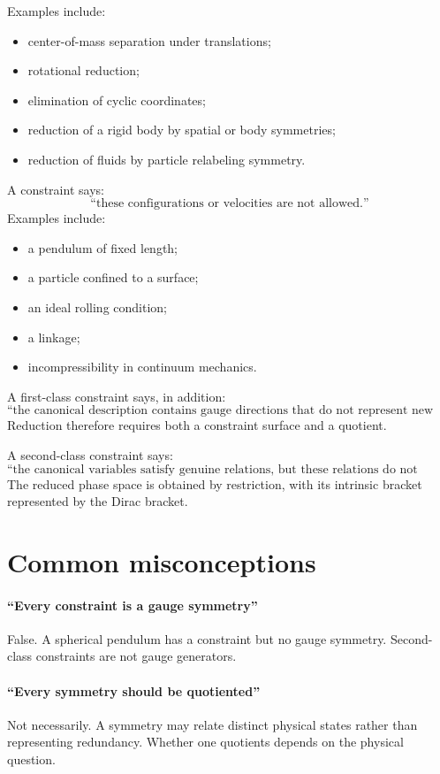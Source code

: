 Examples include:
\begin{itemize}
\item center-of-mass separation under translations;
\item rotational reduction;
\item elimination of cyclic coordinates;
\item reduction of a rigid body by spatial or body symmetries;
\item reduction of fluids by particle relabeling symmetry.
\end{itemize}

A constraint says:
\[
        \text{``these configurations or velocities are not allowed.''}
\]
Examples include:
\begin{itemize}
\item a pendulum of fixed length;
\item a particle confined to a surface;
\item an ideal rolling condition;
\item a linkage;
\item incompressibility in continuum mechanics.
\end{itemize}

A first-class constraint says, in addition:
\[
        \text{``the canonical description contains gauge directions
        that do not represent new physical states.''}
\]
Reduction therefore requires both a constraint surface and a quotient.

A second-class constraint says:
\[
        \text{``the canonical variables satisfy genuine relations,
        but these relations do not generate gauge freedom.''}
\]
The reduced phase space is obtained by restriction, with its intrinsic
bracket represented by the Dirac bracket.

\section{Common misconceptions}

\paragraph{``Every constraint is a gauge symmetry''}
False.  A spherical pendulum has a constraint but no gauge symmetry.
Second-class constraints are not gauge generators.
\paragraph{``Every symmetry should be quotiented''}
Not necessarily.  A symmetry may relate distinct physical states rather than
representing redundancy.  Whether one quotients depends on the physical
question.
